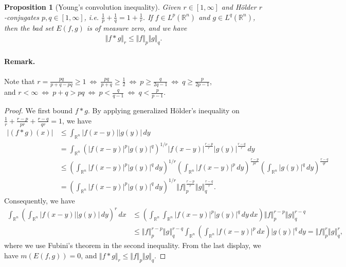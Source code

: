 \documentclass{article}
\numberwithin{equation}{section}
\newcommand{\bbR}{\mathbb{R}}
\theoremstyle{plain}
\newtheorem{proposition}[theorem]{Proposition}
\theoremstyle{definition}
\begin{document}
\begin{proposition}[Young's convolution inequality]\label{prop:1.3}
Given $r\in[1,\infty]$ and Hölder $r$-conjugates $p,q\in[1,\infty]$, i.e. $\frac{1}{p}+\frac{1}{q}=1+\frac{1}{r}$. If $f\in L^p(\bbR^n)$ and $g\in L^q(\bbR^n)$, then the bad set $E(f,g)$ is of measure zero, and we have
\begin{align*}
	\Vert f*g\Vert_r\leq\Vert f\Vert_p\Vert g\Vert_q.
\end{align*}
\end{proposition}
\paragraph{Remark.} Note that $r=\frac{pq}{p+q-pq}\geq 1\ \Leftrightarrow\ \frac{pq}{p+q}\geq\frac{1}{2}\ \Leftrightarrow\  p\geq\frac{q}{2q-1}\ \Leftrightarrow\ q\geq\frac{p}{2p-1}$,\\
and $r<\infty\ \Leftrightarrow\ p+q>pq\ \Leftrightarrow\  p<\frac{q}{q-1}\ \Leftrightarrow\ q<\frac{p}{p-1}$.
\begin{proof}
	We first bound $f*g$. By applying generalized Hölder's inequality on $\frac{1}{r}+\frac{r-p}{pr}+\frac{r-q}{qr}=1$, we have
	\begin{align*}
		\vert (f*g)(x)\vert&\leq\int_{\bbR^n}\left\vert f(x-y)\right\vert\left\vert g(y)\right\vert\,dy\\
		&= \int_{\bbR^n}\left(\vert f(x-y)\vert^p\vert g(y)\vert^q\right)^{1/r}\vert f(x-y)\vert^{\frac{r-p}{r}}\vert g(y)\vert^{\frac{r-q}{r}}\,dy\\
		&\leq\left(\int_{\bbR^n}\vert f(x-y)\vert^p\vert g(y)\vert^q\,dy\right)^{1/r}\left(\int_{\bbR^n}\vert f(x-y)\vert^p\,dy\right)^{\frac{r-p}{pr}}\left(\int_{\bbR^n}\vert g(y)\vert^q\,dy\right)^{\frac{r-q}{qr}}\\
		&=\left(\int_{\bbR^n}\vert f(x-y)\vert^p\vert g(y)\vert^q\,dy\right)^{1/r}\left\Vert f\right\Vert_p^{\frac{r-p}{r}}\left\Vert g\right\Vert_q^{\frac{r-q}{r}}.
	\end{align*}
Consequently, we have
\begin{align*}
	\int_{\bbR^n}\left(\int_{\bbR^n}\left\vert f(x-y)\right\vert\left\vert g(y)\right\vert\,dy\right)^r\,dx&\leq \left(\int_{\bbR^n}\int_{\bbR^n}\vert f(x-y)\vert^p\vert g(y)\vert^q\,dy\,dx\right)\left\Vert f\right\Vert_p^{r-p}\left\Vert g\right\Vert_q^{r-q}\\
	&\leq \left\Vert f\right\Vert_p^{r-p}\left\Vert g\right\Vert_q^{r-q}\int_{\bbR^n}\left(\int_{\bbR^n}\vert f(x-y)\vert^p\,dx\right)\vert g(y)\vert^q\,dy=\left\Vert f\right\Vert_p^r\left\Vert g\right\Vert_q^r,
\end{align*}
where we use Fubini's theorem in the second inequality. From the last display, we have $m(E(f,g))=0$, and $\Vert f*g\Vert_r\leq\Vert f\Vert_p\Vert g\Vert_q$.
\end{proof}
\end{document}
